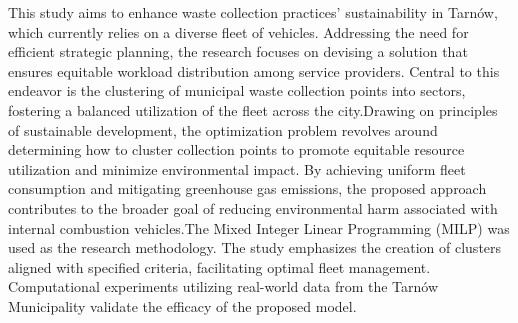 
\begin{Abstrakt}
    This study aims to enhance waste collection practices' sustainability in Tarnów, which currently relies on a diverse fleet of vehicles. Addressing the need for efficient strategic planning, the research focuses on devising a solution that ensures equitable workload distribution among service providers. Central to this endeavor is the clustering of municipal waste collection points into sectors, fostering a balanced utilization of the fleet across the city.\newline Drawing on principles of sustainable development, the optimization problem revolves around determining how to cluster collection points to promote equitable resource utilization and minimize environmental impact. By achieving uniform fleet consumption and mitigating greenhouse gas emissions, the proposed approach contributes to the broader goal of reducing environmental harm associated with internal combustion vehicles.\newline The Mixed Integer Linear Programming (MILP) was used as the research methodology. The study emphasizes the creation of clusters aligned with specified criteria, facilitating optimal fleet management. Computational experiments utilizing real-world data from the Tarnów Municipality validate the efficacy of the proposed model.
\end{Abstrakt}



\clearpage